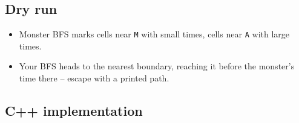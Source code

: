\subsection*{Dry run}


\begin{itemize}
  \item Monster BFS marks cells near \texttt{M} with small times, cells
        near \texttt{A} with large times.
  \item Your BFS heads to the nearest boundary, reaching it before the
        monster's time there -- escape with a printed path.
\end{itemize}

\subsection*{C++ implementation}

